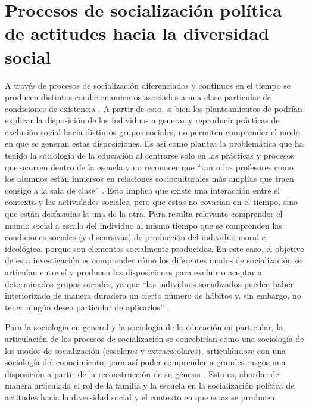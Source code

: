 \documentclass[12pt,twoside]{templates/facsothesis}
\begin{document}
\hypertarget{procesos-de-socializaciuxf3n-poluxedtica-de-actitudes-hacia-la-diversidad-social}{%
\section{Procesos de socialización política de actitudes hacia la diversidad social}\label{procesos-de-socializaciuxf3n-poluxedtica-de-actitudes-hacia-la-diversidad-social}}

A través de procesos de socialización diferenciados y continuos en el tiempo se producen distintos condicionamientos asociados a una clase particular de condiciones de existencia \citep{bourdieu_sentido_2007}. A partir de esto, si bien los planteamientos de \citet{bourdieu_sentido_2007} podrían explicar la disposición de los individuos a generar y reproducir prácticas de exclusión social hacia distintos grupos sociales, no permiten comprender el modo en que se generan estas disposiciones. Es así como \citet{archer_teoria_2009} plantea la problemática que ha tenido la sociología de la educación al centrarse solo en las prácticas y procesos que ocurren dentro de la escuela y no reconocer que ``tanto los profesores como los alumnos están inmersos en relaciones socioculturales más amplias que traen consigo a la sala de clase'' \citep[p.~39]{archer_teoria_2009}. Esto implica que existe una interacción entre el contexto y las actividades sociales, pero que estas no covarían en el tiempo, sino que están desfasadas la una de la otra. Para \citet{lahire_teoria_2012} resulta relevante comprender el mundo social a escala del individuo al mismo tiempo que se comprenden las condiciones sociales (y discursivas) de producción del individuo moral e ideológico, porque son elementos socialmente producidos. En este caso, el objetivo de esta investigación es comprender cómo los diferentes modos de socialización se articulan entre sí y producen las disposiciones para excluir o aceptar a determinados grupos sociales, ya que ``los individuos socializados pueden haber interiorizado de manera duradera un cierto número de hábitos y, sin embargo, no tener ningún deseo particular de aplicarlos'' \citep[p.~87]{lahire_teoria_2012}.

Para la sociología en general y la sociología de la educación en particular, la articulación de los procesos de socialización se concebirían como una sociología de los modos de socialización (escolares y extraescolares), articulándose con una sociología del conocimiento, para así poder comprender a grandes rasgos una disposición a partir de la reconstrucción de su génesis \citep{lahire_teoria_2012}. Esto es, abordar de manera articulada el rol de la familia y la escuela en la socialización política de actitudes hacia la diversidad social y el contexto en que estas se producen.
\end{document}
